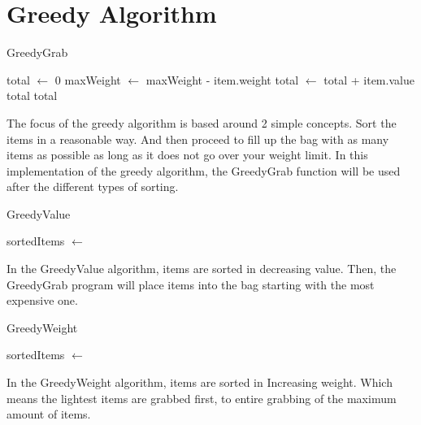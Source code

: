 \documentclass[10pt, letterpaper]{article}
\begin{document}
\section{Greedy Algorithm}

\begin{algorithm}[!htp]
  \begin{algorithmic}
    \caption{GreedyGrab}\label{GreedyGrab}
    \State total $\gets$ 0
    \State maxWeight $\gets$ maxWeight - item.weight
    \State total $\gets$ total + item.value
    \EndIf
    \Return total
    \EndIf
    \EndFor
    \Return total
    \EndFunction
  \end{algorithmic}
\end{algorithm}

The focus of the greedy algorithm is based around 2 simple concepts. Sort the items in a reasonable way. And then proceed to fill up the bag with as many items as possible as long as it does not go over your weight limit. In this implementation of the greedy algorithm, the GreedyGrab function will be used after the different types of sorting.

  \begin{algorithm}[!htp]
    \begin{algorithmic}
      \caption{GreedyValue}\label{GreedyValue}
      \State sortedItems $\gets$ 
      \Return {}
      \EndFunction
    \end{algorithmic}
  \end{algorithm}

In the GreedyValue algorithm, items are sorted in decreasing value. Then, the GreedyGrab program will place items into the bag starting with the most expensive one.

  \begin{algorithm}[!htp]
    \begin{algorithmic}
      \caption{GreedyWeight}\label{GreedyWeight}
      \State sortedItems $\gets$ 
      \Return {}
      \EndFunction
    \end{algorithmic}
  \end{algorithm}

In the GreedyWeight algorithm, items are sorted in Increasing weight. Which means the lightest items are grabbed first, to entire grabbing of the maximum amount of items.
\end{document}
